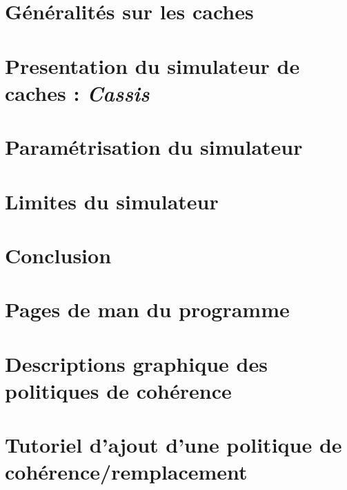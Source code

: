 \documentclass[a4paper]{report}
\begin{document}


\newpage
\tableofcontents

\renewcommand{\labelitemi}{$\bullet$}

\newpage

\newpage
\chapter{Généralités sur les caches}

\newpage
\chapter{Presentation du simulateur de caches : \emph{Cassis}}

\newpage
\chapter{Paramétrisation du simulateur}

\newpage
\chapter{Limites du simulateur}

\newpage
\chapter*{Conclusion}

\newpage
\appendix
\chapter{Pages de man du programme}

\chapter{Descriptions graphique des politiques de cohérence}

\chapter{Tutoriel d'ajout d'une politique de cohérence/remplacement}

\nocite{*}


\end{document}
